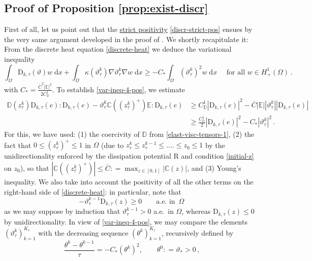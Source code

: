 \documentclass[a4paper,10pt,reqno]{amsart}
\numberwithin{equation}{section}
\numberwithin{equation}{section}
\newcommand{\aein}{\text{a.e.\ in }}
\def\dd{\;\!\mathrm{d}} %
\newcommand{\teta}{\vartheta}
\newcommand{\bbC}{\mathbb{C}}
\newcommand{\bbD}{\mathbb{D}}
\newcommand{\bbE}{\mathbb{E}}
\newcommand{\condu}{\kappa}
\newcommand{\didname}{\mathrm{R}}
\newcommand{\ztau}[1]{z_\tau^{#1}}
\newcommand{\tetau}[1]{\teta_\tau^{#1}}
\newcommand{\Dtau}[2]{\mathrm{D}_{#1,\tau}(#2)}
\begin{document}
\subsection{Proof of Proposition \ref{prop:exist-discr}}
\label{ss:3.2}
First of all, let us point out that the \underline{strict positivity} \eqref{discr-strict-pos} ensues by the very same argument developed in the proof of \cite[Lemma 4.4]{Rocca-Rossi}. We shortly recapitulate it: 
 From the discrete heat equation \eqref{discrete-heat} we deduce the variational inequality
\begin{equation}
\label{var-ineq-4-pos}
\int_\Omega   \Dtau{k}\teta  w \dd x + \int_\Omega \condu(\tetau k) \nabla \tetau k \nabla w \dd x \geq - C_* \int_\Omega (\tetau k)^2 w \dd x \quad \text{ for all } w \in H_+^1(\Omega)\,.
\end{equation}
 with $C_*= \tfrac{ \overline{C}^2 |\bbE|^2}{2 C_\bbD^1} $. 
To establish \eqref{var-ineq-4-pos}, we estimate
\begin{equation}
\label{expedient}
\begin{aligned}
\bbD(\ztau{k})      \Dtau{k} e :  \Dtau{k} e -\tetau{k}  {\bbC}((\ztau{k})^+)\bbE :   \Dtau{k} e   &  \geq C_\bbD^1 | \Dtau{k} e |^2 - \overline{C} |\bbE| |\tetau{k}|| \Dtau{k} e |
\\ & 
\geq \frac{C_\bbD^1}2 | \Dtau{k} e |^2 - C_*|\tetau{k}|^2\,.
\end{aligned}
\end{equation}
For this,  we have used:  (1) the coercivity of $\bbD$ from \eqref{elast-visc-tensors-1},  (2) the fact that
$ 0 \leq (\ztau{k})^+ \leq 1 $ in $\Omega$ (due to $\ztau{k} \leq \ztau{k-1} \leq .... \leq z_0 \leq	 1$ by the unidirectionality enforced 
by the dissipation potential $\didname$ and condition  \eqref{initial-z} on $z_0$), so that 
 $|{\bbC}((\ztau{k})^+)|\leq \overline{C}: = \max_{z\in [0,1]} |\bbC(z)|$, and    (3) Young's inequality. 
 We also take into account the positivity of all the other terms on the right-hand side of \eqref{discrete-heat}: in particular, note that 
\begin{equation}
\label{quoted-before}
- \tetau{k-1} \Dtau{k}{z} \geq 0 \qquad \aein \, \Omega\,
\end{equation}
as we may suppose by induction  that $\tetau{k-1}>0$ a.e.\ in $\Omega$, whereas $ \Dtau{k}{z} \leq 0$ by unidirectionality. 
In view of \eqref{var-ineq-4-pos}, we may compare the elements $(\tetau k)_{k=1}^{K_\tau}$ with the  decreasing sequence $(\theta^k)_{k=1}^{K_\tau}$, recursively defined by
\[
\frac{\theta^k -\theta^{k-1}}{\tau} = - C_* (\theta^k)^2, \qquad \theta^0: = \teta_*>0\,,
\] 
\end{document}
